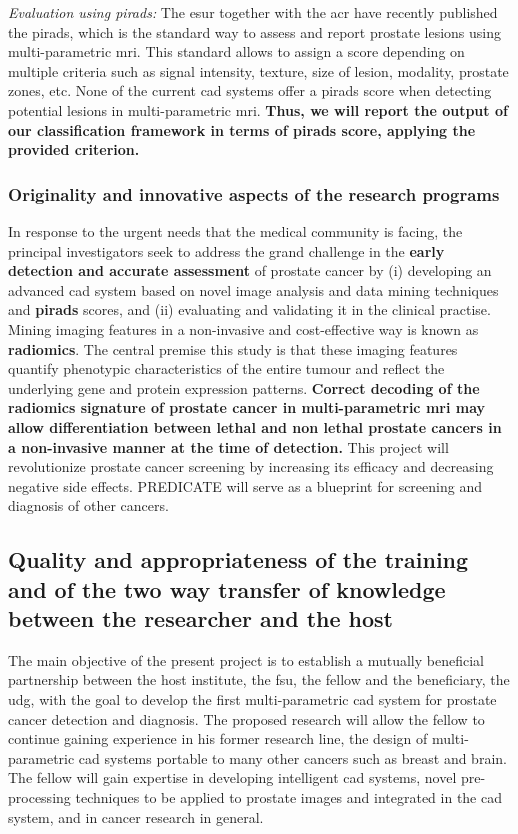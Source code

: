 \emph{Evaluation using \acs*{pirads}:}
The \ac{esur} together with the \ac{acr} have recently published the \ac{pirads}, which is the standard way to assess and report prostate lesions using multi-parametric \ac{mri}.
This standard allows to assign a score depending on multiple criteria such as signal intensity, texture, size of lesion, modality, prostate zones, etc.
None of the current \ac{cad} systems offer a \ac{pirads} score when detecting potential lesions in multi-parametric \ac{mri}.
\textbf{Thus, we will report the output of our classification framework in terms of \ac{pirads} score, applying the provided criterion.}

\subsubsection{Originality and innovative aspects of the research programs}

In response to the urgent needs that the medical community is facing, the principal investigators seek to address the grand challenge in the \textbf{early detection and accurate assessment} of prostate cancer by (i) developing an advanced \ac{cad} system based on novel image analysis and data mining techniques and \textbf{\ac{pirads}} scores, and (ii) evaluating and validating it in the clinical practise. 
Mining imaging features in a non-invasive and cost-effective way is known as \textbf{radiomics}.
The central premise this study is that these imaging features quantify phenotypic characteristics of the entire tumour and reflect the underlying gene and protein expression patterns.
\textbf{Correct decoding of the radiomics signature of prostate cancer in multi-parametric \ac{mri} may allow differentiation between lethal and non lethal prostate cancers in a non-invasive manner at the time of detection.}
This project will revolutionize prostate cancer screening by increasing its efficacy and decreasing negative side effects.
PREDICATE will serve as a blueprint for screening and diagnosis of other cancers.

\subsection{Quality and appropriateness of the training and of the two way transfer of knowledge between the researcher and the host}
\label{sec:transfer}

The main objective of the present project is to establish a mutually beneficial partnership between the host institute, the \ac{fsu}, the fellow and the beneficiary, the \ac{udg}, with the goal to develop the first multi-parametric \ac{cad} system for prostate cancer detection and diagnosis.
The proposed research will allow the fellow to continue gaining experience in his former research line, the design of multi-parametric \ac{cad} systems portable to many other cancers such as breast and brain.
The fellow will gain expertise in developing intelligent \ac{cad} systems, novel pre-processing techniques to be applied to prostate images and integrated in the \ac{cad} system, and in cancer research in general.

